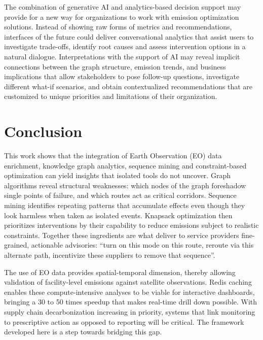 \documentclass[conference]{IEEEtran}
\begin{document}
The combination of generative AI and analytics-based decision support may provide for a new way for organizations to work with emission optimization solutions. Instead of showing raw forms of metrics and recommendations, interfaces of the future could deliver conversational analytics that assist users to investigate trade-offs, identify root causes and assess intervention options in a natural dialogue. Interpretations with the support of AI may reveal implicit connections between the graph structure, emission trends, and business implications that allow stakeholders to pose follow-up questions, investigate different what-if scenarios, and obtain contextualized recommendations that are customized to unique priorities and limitations of their organization.

\section{Conclusion}
This work shows that the integration of Earth Observation (EO) data enrichment, knowledge graph analytics, sequence mining and constraint-based optimization can yield insights that isolated tools do not uncover. Graph algorithms reveal structural weaknesses: which nodes of the graph foreshadow single points of failure, and which routes act as critical corridors. Sequence mining identifies repeating patterns that accumulate effects even though they look harmless when taken as isolated events. Knapsack optimization then prioritizes interventions by their capability to reduce emissions subject to realistic constraints. Together these ingredients are what deliver to service providers fine-grained, actionable advisories: ``turn on this mode on this route, reroute via this alternate path, incentivize these suppliers to remove that sequence''.

The use of EO data provides spatial-temporal dimension, thereby allowing validation of facility-level emissions against satellite observations. Redis caching enables these compute-intensive analyses to be viable for interactive dashboards, bringing a 30 to 50 times speedup that makes real-time drill down possible. With supply chain decarbonization increasing in priority, systems that link monitoring to prescriptive action as opposed to reporting will be critical. The framework developed here is a step towards bridging this gap.



\end{document}
